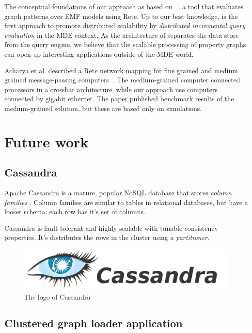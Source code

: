 The conceptual foundations of our approach as based on \eiq{}~\cite{models10}, a tool that evaluates graph patterns over EMF models using Rete. Up to our best knowledge, \iqd{} is the first approach to promote distributed scalability by \emph{distributed incremental query evaluation} in the MDE context. As the architecture of \iqd{} separates the data store from the query engine, we believe that the scalable processing of property graphs can open up interesting applications outside of the MDE world.


Acharya et al. described a Rete network mapping for fine grained and medium grained message-passing computers~\cite{message-passing-rete}. The medium-grained computer connected processors in a crossbar architecture, while our approach use computers connected by gigabit ethernet. The paper published benchmark results of the medium-grained solution, but these are based only on simulations.

\section{Future work}

\subsection{Cassandra}

Apache Cassandra is a mature, popular NoSQL database that stores \textit{column families} \cite{Cassandra}. Column families are similar to tables in relational databases, but have a looser schema: each row has it's set of columns.

Cassandra is fault-tolerant and highly scalable with tunable consistency properties. It's distributes the rows in the cluster using a \textit{partitioner}.

\begin{figure}
\begin{center}
\includegraphics[]{figures/cassandra-logo}
\caption{The logo of Cassandra}
\label{fig:cassandra-logo}
\end{center}
\end{figure}


\subsection{Clustered graph loader application}


